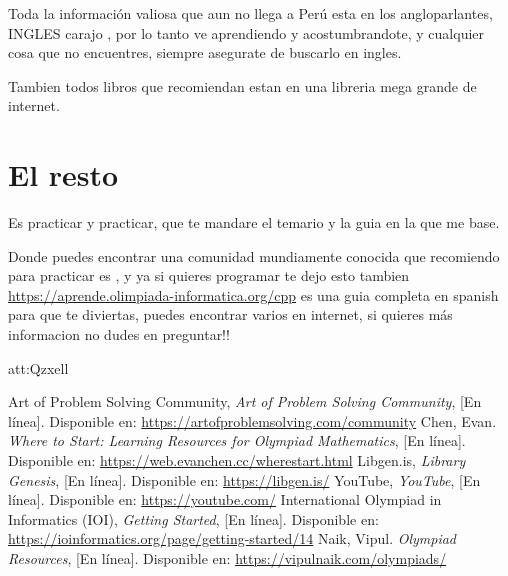 \documentclass[11pt]{scrartcl}
\begin{document}
Toda la informaci\'on valiosa que aun no llega a Per\'u esta en los angloparlantes, INGLES carajo , por lo tanto ve aprendiendo y acostumbrandote, y cualquier cosa que no encuentres, siempre asegurate de buscarlo en ingles.

Tambien todos libros que recomiendan estan en una libreria mega grande de internet.\cite{libgen}

\section{El resto}
Es practicar y practicar, que te mandare el temario y la guia en la que me base.

Donde puedes encontrar una comunidad mundiamente conocida que recomiendo para practicar es \cite{artofproblemsolving}, y ya si quieres programar te dejo esto tambien \url{https://aprende.olimpiada-informatica.org/cpp} es una guia completa en spanish para que te diviertas, puedes encontrar varios en internet, si quieres m\'as informacion no dudes en preguntar!!

att:Qzxell


\begin{thebibliography}{9}

Art of Problem Solving Community,
\emph{Art of Problem Solving Community},
[En línea]. Disponible en: \url{https://artofproblemsolving.com/community}
Chen, Evan.
\emph{Where to Start: Learning Resources for Olympiad Mathematics},
[En línea]. Disponible en: \url{https://web.evanchen.cc/wherestart.html}
Libgen.is,
\emph{Library Genesis},
[En línea]. Disponible en: \url{https://libgen.is/}
YouTube,
\emph{YouTube},
[En línea]. Disponible en: \url{https://youtube.com/}
International Olympiad in Informatics (IOI),
\emph{Getting Started},
[En línea]. Disponible en: \url{https://ioinformatics.org/page/getting-started/14}
Naik, Vipul.
\emph{Olympiad Resources},
[En línea]. Disponible en: \url{https://vipulnaik.com/olympiads/}

\end{thebibliography}
\end{document}
